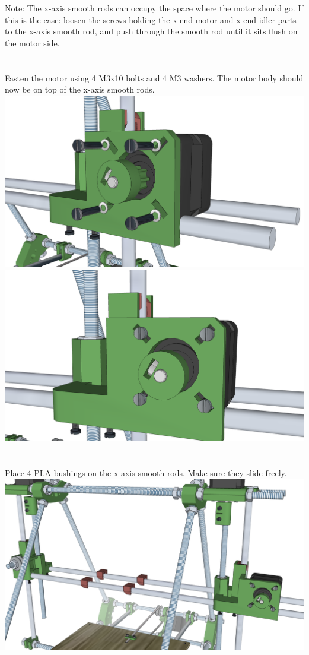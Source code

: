 \documentclass[twoside,a4paper,titlepage]{memoir}
\begin{document}
	Note: The x-axis smooth rods can occupy the space where the motor should go.
	If this is the case: loosen the screws holding the x-end-motor and x-end-idler parts to
	the x-axis smooth rod, and push through the smooth rod until it sits flush on the motor
	side.
	
	\section{}
	Fasten the motor using 4 M3x10 bolts and 4 M3 washers. The motor body should now be on top of the
	x-axis smooth rods.\\
	\includegraphics[width=1\linewidth]{graphics/ch9_6_1.png}
	\includegraphics[width=1\linewidth]{graphics/ch9_6_2.png}
	
	\section{}
	Place 4 PLA bushings on the x-axis smooth rods. Make sure they slide freely.\\
	\includegraphics[width=1\linewidth]{graphics/ch9_7.png}
	
\end{document}
